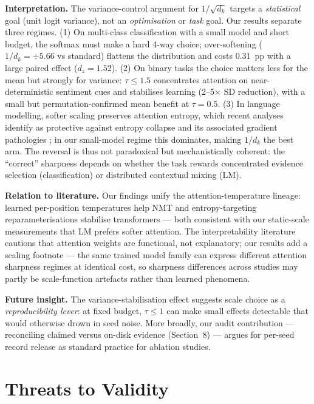 \documentclass[11pt,a4paper]{article}
\begin{document}
\textbf{Interpretation.} The variance-control argument for $1/\sqrt{d_k}$ targets a \emph{statistical} goal (unit logit variance), not an \emph{optimisation} or \emph{task} goal. Our results separate three regimes. (1) On multi-class classification with a small model and short budget, the softmax must make a hard 4-way choice; over-softening ($1/d_k = \div 5.66$ vs standard) flattens the distribution and costs 0.31~pp with a large paired effect ($d_z{=}1.52$). (2) On binary tasks the choice matters less for the mean but strongly for variance: $\tau \le 1.5$ concentrates attention on near-deterministic sentiment cues and stabilises learning (2--5$\times$ SD reduction), with a small but permutation-confirmed mean benefit at $\tau{=}0.5$. (3) In language modelling, softer scaling preserves attention entropy, which recent analyses identify as protective against entropy collapse and its associated gradient pathologies \cite{zhai2023,hong2025}; in our small-model regime this dominates, making $1/d_k$ the best arm. The reversal is thus not paradoxical but mechanistically coherent: the ``correct'' sharpness depends on whether the task rewards concentrated evidence selection (classification) or distributed contextual mixing (LM).

\textbf{Relation to literature.} Our findings unify the attention-temperature lineage: learned per-position temperatures help NMT \cite{lin2018} and entropy-targeting reparameterisations stabilise transformers \cite{zhai2023} --- both consistent with our static-scale measurements that LM prefers softer attention. The interpretability literature \cite{jain2019,wiegreffe2019} cautions that attention weights are functional, not explanatory; our results add a scaling footnote --- the same trained model family can express different attention sharpness regimes at identical cost, so sharpness differences across studies may partly be scale-function artefacts rather than learned phenomena.

\textbf{Future insight.} The variance-stabilisation effect suggests scale choice as a \emph{reproducibility lever}: at fixed budget, $\tau \le 1$ can make small effects detectable that would otherwise drown in seed noise. More broadly, our audit contribution --- reconciling claimed versus on-disk evidence (Section~8) --- argues for per-seed record release as standard practice for ablation studies.

\section{Threats to Validity}
\end{document}
